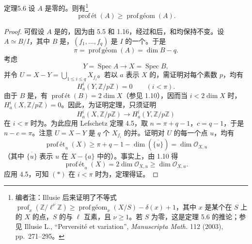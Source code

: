 \begin{SGAresult}{定理}{5.6}
设 $A$ 是零的。则有\footnote{编者注：Illusie 后来证明了不等式 $\operatorname{prof}_x(\mathbb Z/\ell^\nu\mathbb Z)\geq\operatorname{prof\,\text{géom}}_x(X/S)-\delta(x)+1$，其中 $x$ 是某个在 $S$ 上的 $X$ 的点，$S$ 的与 $\ell$ 互素，且 $\nu\geq1$。若 $S$ 为零，这是定理 5.6 的推论；参见 Illusie L., ``Perversité et variation'', \emph{Manuscripta Math.} 112 (2003), pp.~271--295。}
\[
\operatorname{prof\,\text{ét}}(A)\geq\operatorname{prof\,\text{géom}}(A).
\]
\end{SGAresult}
\begin{proof}
可假设 $A$ 是的，因为由 5.5 和 1.16，经过和后，和均保持不变。设 $A\simeq B/I$，其中 $B$ 是，$(f_1,\ldots,f_q)$ 是 $I$ 的一个。于是
\[
\pi=\operatorname{prof\,\text{géom}}(A)=\dim B-q.
\]
考虑
\[
Y=\operatorname{Spec}A\longrightarrow X=\operatorname{Spec}B,
\]
并令 $U=X-Y=\bigcup_{1\leq i\leq q}X_{f_i}$。若以 $a$ 表示 $X$ 的，需证明对每个素数 $p$，均有
\[
H^i_a(Y,\mathbb Z/p\mathbb Z)=0\qquad(i<\pi).
\]
由于 $B$ 是，有 $\operatorname{prof\,\text{ét}}(B)=2\dim X$（参见 1.10），因而当 $i<2\dim X$ 时，$H^i_a(X,\mathbb Z/p\mathbb Z)=0$。因此，为证明定理，只须证明
\[
H^i_a(X,\mathbb Z/p\mathbb Z)\longrightarrow H^i_a(Y,\mathbb Z/p\mathbb Z)\tag{*}
\]
在 $i<\pi$ 时为。为此应用 Lefschetz 定理 4.5，取 $n=\pi+q-1$，$c=q-1$，于是 $n-c=\pi$。注意 $U=X-Y$ 是 $q$ 个 $X_{f_i}$ 的并。证明对 $U$ 的每一个点 $u$，均有
\[
\operatorname{prof\,\text{ét}}_u(X)\geq\pi+q-1-\dim(\overline{\{u\}})
=\dim\mathscr O_{X,u}
\]
（其中 $\overline{\{u\}}$ 表示 $u$ 在 $X-\{a\}$ 中的）。事实上，由 1.10 得
\[
\operatorname{prof\,\text{ét}}_u(X)=2\dim\mathscr O_{X,u}\geq\dim\mathscr O_{X,u}.
\]
应用 4.5，可知 $(*)$ 在 $i<\pi$ 时为，定理得证。
\end{proof}

